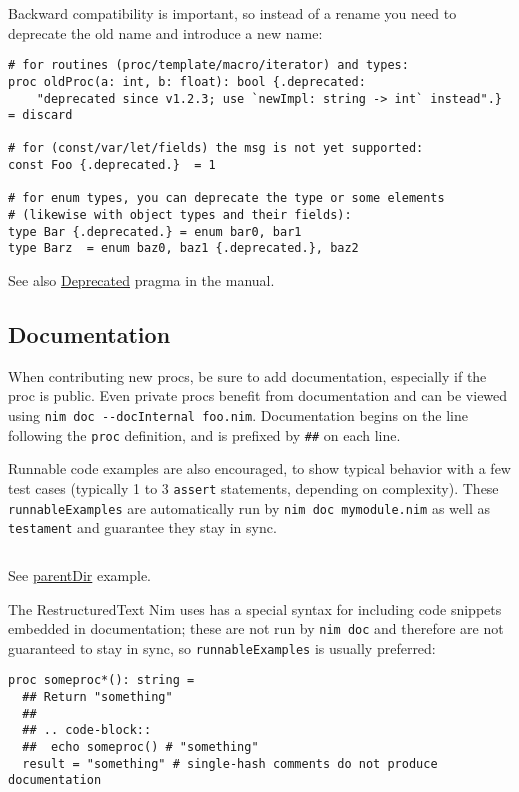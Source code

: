 Backward compatibility is important, so instead of a rename you need to
deprecate the old name and introduce a new name:

\begin{verbatim}
# for routines (proc/template/macro/iterator) and types:
proc oldProc(a: int, b: float): bool {.deprecated:
    "deprecated since v1.2.3; use `newImpl: string -> int` instead".} = discard

# for (const/var/let/fields) the msg is not yet supported:
const Foo {.deprecated.}  = 1

# for enum types, you can deprecate the type or some elements
# (likewise with object types and their fields):
type Bar {.deprecated.} = enum bar0, bar1
type Barz  = enum baz0, baz1 {.deprecated.}, baz2
\end{verbatim}

See also \href{manual.html\#pragmas-deprecated-pragma}{Deprecated}
pragma in the manual.

\hypertarget{documentation}{%
\subsection{Documentation}\label{documentation}}

When contributing new procs, be sure to add documentation, especially if
the proc is public. Even private procs benefit from documentation and
can be viewed using \texttt{nim\ doc\ -\/-docInternal\ foo.nim}.
Documentation begins on the line following the \texttt{proc} definition,
and is prefixed by \texttt{\#\#} on each line.

Runnable code examples are also encouraged, to show typical behavior
with a few test cases (typically 1 to 3 \texttt{assert} statements,
depending on complexity). These \texttt{runnableExamples} are
automatically run by \texttt{nim\ doc\ mymodule.nim} as well as
\texttt{testament} and guarantee they stay in sync.

\begin{verbatim}
\end{verbatim}

See \href{os.html\#parentDir,string}{parentDir} example.

The RestructuredText Nim uses has a special syntax for including code
snippets embedded in documentation; these are not run by
\texttt{nim\ doc} and therefore are not guaranteed to stay in sync, so
\texttt{runnableExamples} is usually preferred:

\begin{verbatim}
proc someproc*(): string =
  ## Return "something"
  ##
  ## .. code-block::
  ##  echo someproc() # "something"
  result = "something" # single-hash comments do not produce documentation
\end{verbatim}

